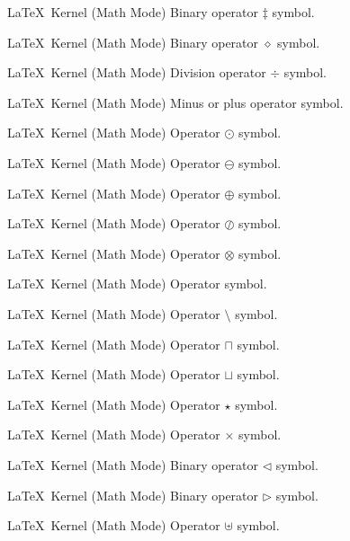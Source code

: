 %
 {}%
 {\LaTeX\ Kernel (Math Mode)}%
 {Binary operator \ensuremath{\ddagger} symbol.}%
 {}

%
 {}%
 {\LaTeX\ Kernel (Math Mode)}%
 {Binary operator \ensuremath{\diamond} symbol.}%
 {}

%
 {}%
 {\LaTeX\ Kernel (Math Mode)}%
 {Division operator \ensuremath{\div} symbol.}%
 {}

%
 {}%
 {\LaTeX\ Kernel (Math Mode)}%
 {Minus or plus operator  symbol.}%
 {}

%
 {}%
 {\LaTeX\ Kernel (Math Mode)}%
 {Operator \ensuremath{\odot} symbol.}%
 {}

%
 {}%
 {\LaTeX\ Kernel (Math Mode)}%
 {Operator \ensuremath{\ominus} symbol.}%
 {}

%
 {}%
 {\LaTeX\ Kernel (Math Mode)}%
 {Operator \ensuremath{\oplus} symbol.}%
 {}

%
 {}%
 {\LaTeX\ Kernel (Math Mode)}%
 {Operator \ensuremath{\oslash} symbol.}%
 {}

%
 {}%
 {\LaTeX\ Kernel (Math Mode)}%
 {Operator \ensuremath{\otimes} symbol.}%
 {}

%
 {}%
 {\LaTeX\ Kernel (Math Mode)}%
 {Operator  symbol.}%
 {}

%
 {}%
 {\LaTeX\ Kernel (Math Mode)}%
 {Operator \ensuremath{\setminus} symbol.}%
 {}

%
 {}%
 {\LaTeX\ Kernel (Math Mode)}%
 {Operator \ensuremath{\sqcap} symbol.}%
 {}

%
 {}%
 {\LaTeX\ Kernel (Math Mode)}%
 {Operator \ensuremath{\sqcup} symbol.}%
 {}

%
 {}%
 {\LaTeX\ Kernel (Math Mode)}%
 {Operator \ensuremath{\star} symbol.}%
 {}

%
 {}%
 {\LaTeX\ Kernel (Math Mode)}%
 {Operator \ensuremath{\times} symbol.}%
 {}

%
 {}%
 {\LaTeX\ Kernel (Math Mode)}%
 {Binary operator \ensuremath{\triangleleft} symbol.}%
 {}

%
 {}%
 {\LaTeX\ Kernel (Math Mode)}%
 {Binary operator \ensuremath{\triangleright} symbol.}%
 {}

%
 {}%
 {\LaTeX\ Kernel (Math Mode)}%
 {Operator \ensuremath{\uplus} symbol.}%
 {}

